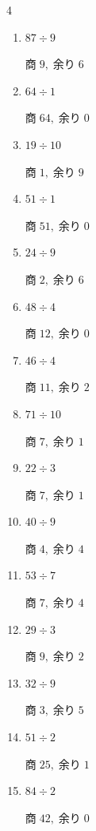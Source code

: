 \begin{multicols}{4}
\begin{enumerate}
  \item $87 \div 9$

        $商\; 9,\; 余り\; 6$

  \item $64 \div 1$

        $商\; 64,\; 余り\; 0$

  \item $19 \div 10$

        $商\; 1,\; 余り\; 9$

\columnbreak %

  \item $51 \div 1$

        $商\; 51,\; 余り\; 0$

  \item $24 \div 9$

        $商\; 2,\; 余り\; 6$

  \item $48 \div 4$

        $商\; 12,\; 余り\; 0$

  \item $46 \div 4$

        $商\; 11,\; 余り\; 2$

  \item $71 \div 10$

        $商\; 7,\; 余り\; 1$

  \item $22 \div 3$

        $商\; 7,\; 余り\; 1$

  \item $40 \div 9$

        $商\; 4,\; 余り\; 4$

  \item $53 \div 7$

        $商\; 7,\; 余り\; 4$

  \item $29 \div 3$

        $商\; 9,\; 余り\; 2$

  \item $32 \div 9$

        $商\; 3,\; 余り\; 5$

  \item $51 \div 2$

        $商\; 25,\; 余り\; 1$

  \item $84 \div 2$

        $商\; 42,\; 余り\; 0$


\end{enumerate}
\end{multicols}
